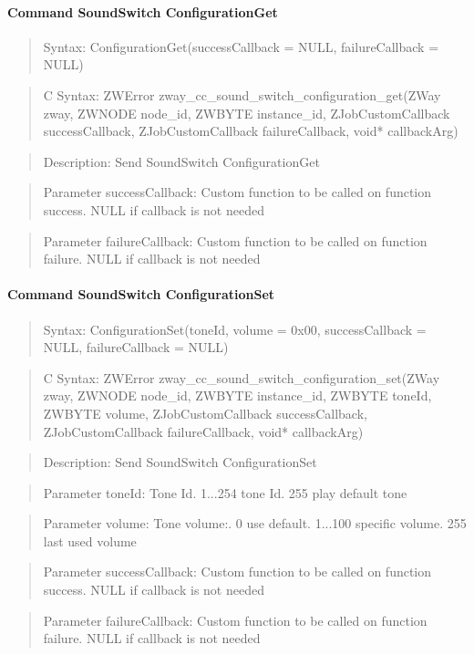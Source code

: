 \paragraph{Command SoundSwitch ConfigurationGet}
\begin{quote}Syntax: ConfigurationGet(successCallback = NULL, failureCallback = NULL)\end{quote}
\begin{quote}C Syntax: ZWError zway\_cc\_sound\_switch\_configuration\_get(ZWay zway, ZWNODE node\_id, ZWBYTE instance\_id, ZJobCustomCallback successCallback, ZJobCustomCallback failureCallback, void* callbackArg)\end{quote}
\begin{quote}Description: Send SoundSwitch ConfigurationGet\end{quote}
\begin{quote}Parameter successCallback: Custom function to be called on function success. NULL if callback is not needed\end{quote}
\begin{quote}Parameter failureCallback: Custom function to be called on function failure. NULL if callback is not needed\end{quote}


\paragraph{Command SoundSwitch ConfigurationSet}
\begin{quote}Syntax: ConfigurationSet(toneId, volume = 0x00, successCallback = NULL, failureCallback = NULL)\end{quote}
\begin{quote}C Syntax: ZWError zway\_cc\_sound\_switch\_configuration\_set(ZWay zway, ZWNODE node\_id, ZWBYTE instance\_id, ZWBYTE toneId, ZWBYTE volume, ZJobCustomCallback successCallback, ZJobCustomCallback failureCallback, void* callbackArg)\end{quote}
\begin{quote}Description: Send SoundSwitch ConfigurationSet\end{quote}
\begin{quote}Parameter toneId: Tone Id. 1...254 tone Id. 255 play default tone\end{quote}
\begin{quote}Parameter volume: Tone volume:. 0 use default. 1...100 specific volume. 255 last used volume\end{quote}
\begin{quote}Parameter successCallback: Custom function to be called on function success. NULL if callback is not needed\end{quote}
\begin{quote}Parameter failureCallback: Custom function to be called on function failure. NULL if callback is not needed\end{quote}



